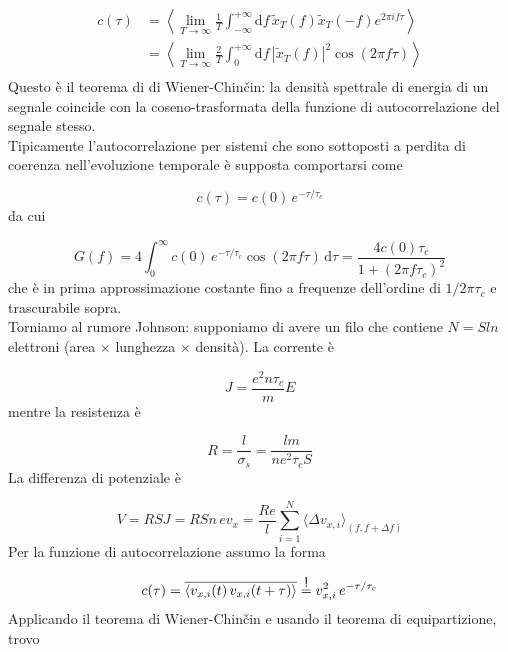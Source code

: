 \documentclass[a4paper]{report}
\newcommand\impongo{\mathrel{\overset{\makebox[0pt]{\mbox{\normalfont\sffamily !}}}{=}}}
\begin{document}
\begin{equation}
    \begin{split}
    c(\tau) & = \left\langle\lim_{T\to\infty} \frac{1}{T}  \int_{-\infty}^{+\infty} \mathrm{d}f\, \tilde{x}_T(f)\tilde{x}_T(-f)e^{2\pi i f \tau} \right\rangle \\ 
    & = \left\langle\lim_{T\to\infty} \frac{2}{T}  \int_{0}^{+\infty} \mathrm{d}f\, |\tilde{x}_T(f)|^2 \cos(2\pi f \tau) \right\rangle \\
\end{split}
\end{equation}
Questo è il teorema di di Wiener-Chin\v{c}in: la densità spettrale di energia di un segnale coincide con la coseno-trasformata della funzione di autocorrelazione del segnale stesso.\\
Tipicamente l'autocorrelazione per sistemi che sono sottoposti a perdita di coerenza nell'evoluzione temporale è supposta comportarsi come

\begin{equation}
    c(\tau) = c(0)\,e^{-\tau/\tau_c}
\end{equation}
da cui

\begin{equation}
    G(f) = 4 \int_{0}^{\infty} c(0)\,e^{-\tau/\tau_c}\cos(2\pi f \tau) \,\mathrm{d}\tau = \frac{4 c(0) \tau_c}{1+(2\pi f \tau_c)^2}
\end{equation}
che è in prima approssimazione costante fino a frequenze dell'ordine di $1/2\pi\tau_c$ e trascurabile sopra. \\
Torniamo al rumore Johnson: supponiamo di avere un filo che contiene $N = Sln$ elettroni (area $\times$ lunghezza $\times$ densità). La corrente è

\begin{equation}
    J = \frac{e^2 n \tau_c}{m} E
\end{equation}
mentre la resistenza è

\begin{equation}
    R = \frac{l}{\sigma_s} = \frac{l m}{n e^2 \tau_c S}
\end{equation}
La differenza di potenziale è 

\begin{equation}
    V = R S J = R S n \,e v_x = \frac{R e}{l} \sum_{i=1}^N \langle\Delta v_{x,i}\rangle_{(f, f+\Delta f)}
\end{equation}
Per la funzione di autocorrelazione assumo la forma

\begin{equation}
    c(\tau) = \overline{\langle v_{x,i}(t)\,v_{x,i}(t+\tau) \rangle} \impongo v^2_{x,i} \,e^{-\tau/\tau_c}
\end{equation}
Applicando il teorema di Wiener-Chin\v{c}in e usando il teorema di equipartizione, trovo
\end{document}
